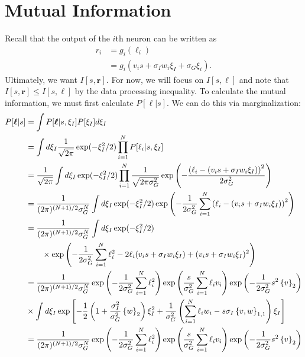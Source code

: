 \documentclass[11pt]{article}
\begin{document}
\section{Mutual Information}

Recall that the output of the $i$th neuron can be written as 
\begin{align}
	r_i &= g_i(\ell_i) \\
	&= g_i(v_i s + \sigma_I w_i \xi_I + \sigma_G\xi_i).
\end{align}
Ultimately, we want $I[s, \mathbf{r}]$. For now, we will focus on $I[s, \boldsymbol{\ell}]$ and note that $I[s,\mathbf{r}] \leq I[s, \boldsymbol{\ell}]$ by the data processing inequality. To calculate the mutual information, we must first calculate $P[\boldsymbol{\ell}|s]$. We can do this via marginalization:
\begin{align}
	P[\boldsymbol{\ell}|s] &= \int P[\boldsymbol{\ell}|s, \xi_I] P[\xi_I]d\xi_I \\
	&= \int d\xi_I  \frac{1}{\sqrt{2\pi}} \exp(-\xi_I^2/2) \prod_{i=1}^N P[\ell_i|s,\xi_I] \\
	&=  \frac{1}{\sqrt{2\pi}} \int d\xi_I   \exp(-\xi_I^2/2) \prod_{i=1}^N \frac{1}{\sqrt{2\pi \sigma_G^2}} \exp\left(-\frac{\left(\ell_i - (v_i s + \sigma_I w_i \xi_I)\right)^2}{2\sigma_G^2}\right) \\
	&= \frac{1}{(2\pi)^{(N+1)/2}\sigma_G^N} \int d\xi_I \exp(-\xi_I^2/2) \exp\left(-\frac{1}{2\sigma_G^2}\sum_{i=1}^N \left(\ell_i - (v_i s + \sigma_I w_i \xi_I)\right)^2\right) \\
	&= \frac{1}{(2\pi)^{(N+1)/2}\sigma_G^N} \int d\xi_I \exp(-\xi_I^2/2) \notag \\
	& \qquad \times \exp\left(-\frac{1}{2\sigma_G^2}\sum_{i=1}^N \ell_i^2 -2\ell_i (v_i s + \sigma_I w_i \xi_I) + (v_i s + \sigma_I w_i \xi_I)^2\right) \\
	&= \frac{1}{(2\pi)^{(N+1)/2}\sigma_G^N} \exp\left(-\frac{1}{2\sigma_G^2}\sum_{i=1}^N \ell_i^2\right)\exp\left(\frac{s}{\sigma_G^2}\sum_{i=1}^N \ell_i v_i \right)\exp\left(-\frac{1}{2\sigma_G^2}s^2 \left\{v\right\}_2\right) \notag \\
	&\times \int d\xi_I\exp\left[-\frac{1}{2}\left(1+\frac{\sigma_I^2}{\sigma_G^2} \left\{w\right\}_2\right)\xi_I^2 +\frac{1}{\sigma_G^2}\left( \sum_{i=1}^N \ell_i w_i - s\sigma_I \left\{v,w\right\}_{1,1}\right)\xi_I \right] \\
	&=  \frac{1}{(2\pi)^{(N+1)/2}\sigma_G^N}\exp\left(-\frac{1}{2\sigma_G^2}\sum_{i=1}^N \ell_i^2\right)\exp\left(\frac{s}{\sigma_G^2}\sum_{i=1}^N \ell_i v_i \right)\exp\left(-\frac{1}{2\sigma_G^2}s^2 \left\{v\right\}_2\right) \notag \\

\end{align}
\end{document}
